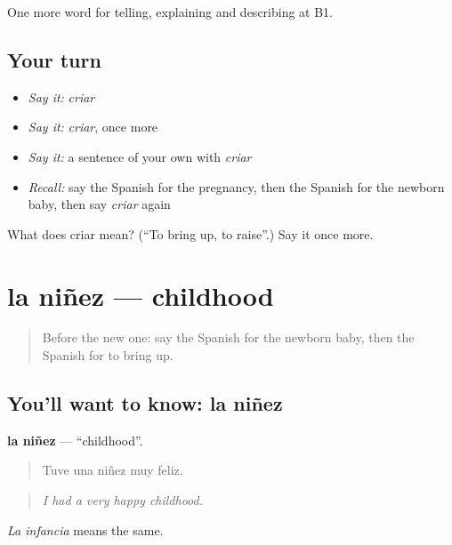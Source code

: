 \begin{grammarlens}[title={What you've built}]
One more word for telling, explaining and describing at B1.
\end{grammarlens}

\subsection*{Your turn}
\begin{itemize}
\raggedright
  \item \emph{Say it:} \emph{criar}
  \item \emph{Say it:} \emph{criar}, once more
  \item \emph{Say it:} a sentence of your own with \emph{criar}
  \item \emph{Recall:} say the Spanish for the pregnancy, then the Spanish for the newborn baby, then say \emph{criar} again
\end{itemize}

\begin{tcolorbox}[breakable,colback=teal!4,colframe=teal!35!black,title={Before you move on}]
What does criar mean? (\textquotedblleft{}To bring up, to raise\textquotedblright{}.) Say it once more.
\end{tcolorbox}
\section[la niñez]{la niñez — childhood}

\label{lesson:ES-C545-ninez}



\begin{quote}
Before the new one: say the Spanish for the newborn baby, then the Spanish for to bring up.
\end{quote}

\subsection*{You'll want to know: la niñez}
\textbf{la niñez} — \textquotedblleft{}childhood\textquotedblright{}.

\begin{quote}
Tuve una niñez muy feliz.
\end{quote}

\begin{quote}
\emph{I had a very happy childhood.}
\end{quote}

\emph{La infancia} means the same.

